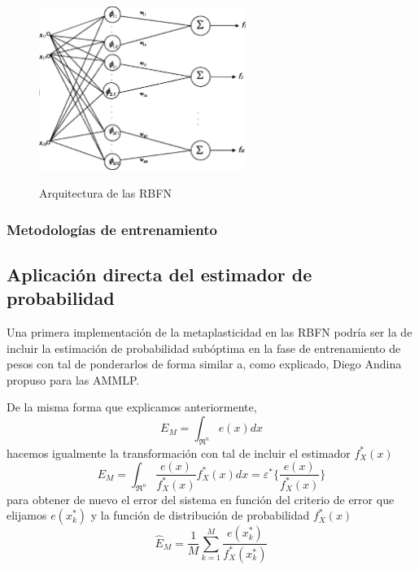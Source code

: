 \documentclass[10pt,a4paper]{report}
\begin{document}
\begin{figure}[h!]{}
    \centering
    \includegraphics[width=0.6\textwidth]{img/RBFN1.png}
    \label{fig:RBFN1}
    \caption{Arquitectura de las RBFN}
\end{figure}

\subsubsection{Metodologías de entrenamiento}
\subsection{Aplicación directa del estimador de probabilidad}
Una primera implementación de la metaplasticidad en las RBFN podría ser la de incluir la estimación de probabilidad subóptima en la fase de entrenamiento de pesos con tal de ponderarlos de forma similar a, como explicado, Diego Andina propuso para las AMMLP\citep{Andina2009}.

De la misma forma que explicamos anteriormente, 
\begin{equation}
	E_M = \int_{\Re^n}{e(x)dx}
\end{equation}
hacemos igualmente la transformación con tal de incluir el estimador $f^*_X(x)$
\begin{equation}
	\label{metaRBFN1}
	E_M = \int_{\Re^n}\dfrac{e(x)}{f^*_X(x)}f^*_X(x)dx = \varepsilon^*\lbrace\dfrac{e(x)}{f^*_X(x)}\rbrace
\end{equation}
para obtener de nuevo el error del sistema en función del criterio de error que elijamos $e(x^*_k)$ y la función de distribución de probabilidad $f^*_X(x)$
\begin{equation}
	\label{metaRBFN2}
	\widehat{E}_M=\dfrac{1}{M}\sum^M_{k=1}\dfrac{e(x^*_k)}{f^*_X(x^*_k)}
\end{equation}
\end{document}
